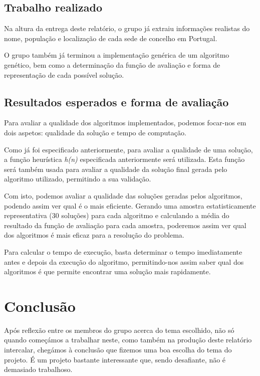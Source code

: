 \documentclass[11pt,a4paper,reqno]{article}
\numberwithin{equation}{section}
\begin{document}
\subsection{Trabalho realizado}
Na altura da entrega deste relatório, o grupo já extraiu informações realistas do nome, população e localização de cada sede de concelho em Portugal.

O grupo também já terminou a implementação genérica de um algoritmo genético, bem como a determinação da função de avaliação e forma de representação de cada possível solução.

\subsection{Resultados esperados e forma de avaliação}
Para avaliar a qualidade dos algoritmos implementados, podemos focar-nos em dois aspetos: qualidade da solução e tempo de computação.

Como já foi especificado anteriormente, para avaliar a qualidade de uma solução, a função heurística \textit{h(n)} especificada anteriormente será utilizada. Esta função será também usada para avaliar a qualidade da solução final gerada pelo algoritmo utilizado, permitindo a sua validação.

Com isto, podemos avaliar a qualidade das soluções geradas pelos algoritmos, podendo assim ver qual é o mais eficiente. Gerando uma amostra estatisticamente representativa (30 soluções) para cada algoritmo e calculando a média do resultado da função de avaliação para cada amostra, poderemos assim ver qual dos algoritmos é mais eficaz para a resolução do problema.

Para calcular o tempo de execução, basta determinar o tempo imediatamente antes e depois da execução do algoritmo, permitindo-nos assim saber qual dos algoritmos é que permite encontrar uma solução mais rapidamente.



\newpage

\section{Conclusão}
Após reflexão entre os membros do grupo acerca do tema escolhido, não só quando começámos a trabalhar neste, como também na produção deste relatório intercalar, chegámos à conclusão que fizemos uma boa escolha do tema do projeto. É um projeto bastante interessante que, sendo desafiante, não é demasiado trabalhoso.
\end{document}
